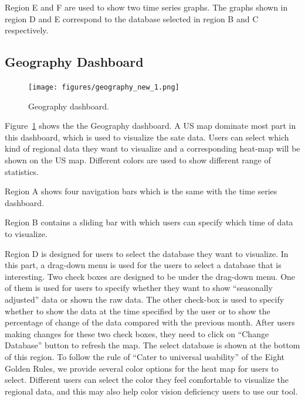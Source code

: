 \documentclass{sigchi}
\begin{document}
Region E and F are used to show two time series graphs. The graphs shown in region D and E correspond to the  database selected in region B and C respectively.



\subsection{Geography Dashboard}

\begin{figure}[!htbp]
\centering
\texttt{[image: figures/geography\_new\_1.png]}
\caption{Geography dashboard.}
\label{fig:Geography}
\end{figure}

Figure~\ref{fig:Geography} shows the the Geography dashboard. A US map dominate most part in this dashboard, which is used to visualize the sate data. Users can select which kind of regional data they want to visualize and a corresponding heat-map will be shown on the US map. Different colors are used to show different range of statistics.

Region A shows four navigation bars which is the same with the time series dashboard.

Region B contains a sliding bar with which users can specify which time of data to visualize.

Region D is designed for users to select the database they want to visualize. In this part, a drag-down menu is used for the users to select a database that is interesting. Two check boxes are designed to be under the drag-down menu. One of them is used for users to specify whether they want to show ``seasonally adjusted'' data or shown the raw data. The other check-box is used to specify whether to show the data at the time specified by the user or to show the percentage of change of the data compared with the previous month. After users making changes for these two check boxes, they need to click on ``Change Database'' button to refresh the map. The select database is shown at the bottom of this region. To follow the rule of ``Cater to universal usability'' of the Eight Golden Rules\cite{eight}, we provide several color options for the heat map for users to select. Different users can select the color they feel comfortable to visualize the regional data, and this may also help
color vision deficiency users to use our tool.
\end{document}
